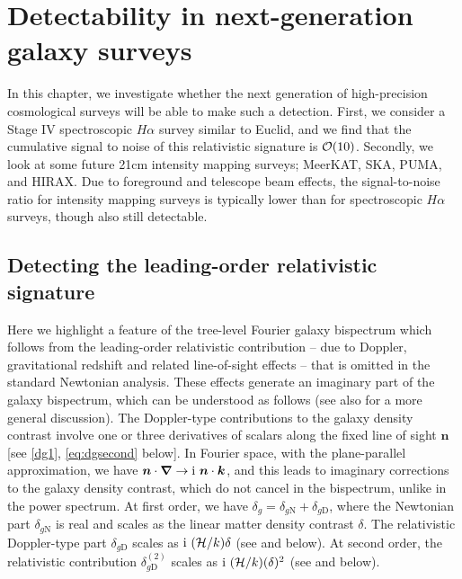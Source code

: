 \chapter{Detectability in next-generation galaxy surveys}
\label{chapter:detect}


In this chapter, we investigate whether the next generation of high-precision cosmological surveys will be able to make such a detection. First, we consider a Stage IV spectroscopic $H\alpha$ survey similar to Euclid, and we find that the cumulative signal to noise of this relativistic signature  is $\mathcal{O}(10)$. Secondly, we look at some future 21cm intensity mapping surveys; MeerKAT, SKA, PUMA, and HIRAX. Due to foreground and telescope beam effects, the signal-to-noise ratio for intensity mapping surveys is typically lower than for spectroscopic $H\alpha$ surveys, though also still detectable.

\section{Detecting the leading-order relativistic signature}


Here we highlight a feature of the tree-level Fourier galaxy bispectrum which follows from the  leading-order relativistic contribution -- due to Doppler, gravitational redshift  and related line-of-sight effects -- that is omitted in the standard Newtonian analysis. These effects generate an imaginary part of the galaxy bispectrum, which can be understood as follows (see also \cite{McDonald:2009dh,Clarkson:2018dwn,Jeong:2019igb} for a more general discussion).  
The Doppler-type contributions to the galaxy density contrast involve one or three derivatives  of scalars along the fixed line of sight $\bm n$ [see \eqref{dg1}, \eqref{eq:dgsecond} below]. In Fourier space, with the plane-parallel approximation, we have  $\bm{n}\cdot\bm{\nabla} \to {\mathrm{i\,}}\, \bm{n}\cdot\bm{k}$, and this leads to imaginary corrections to the galaxy density contrast, which do not cancel in the bispectrum, unlike in the power spectrum. At first order, we have $\delta_g=\delta_{g\mathrm{N}}+ \delta_{g\mathrm{D}}$, where the Newtonian part $\delta_{g\mathrm{N}}$ is real and scales as the linear matter density contrast $\delta$. The 
relativistic Doppler-type part $\delta_{g\mathrm{D}}$ scales as ${\mathrm{i\,}}\,(\mathcal{H}/k) \delta$  (see \cite{McDonald:2009dh, Jeong:2011as, Abramo:2017xnp,Clarkson:2018dwn} and below). At second  order, the relativistic contribution $\delta_{g\mathrm{D}}^{(2)}$ scales as ${\mathrm{i\,}}\,(\mathcal{H}/k) (\delta)^2$ (see \cite{Clarkson:2018dwn} and below). 



